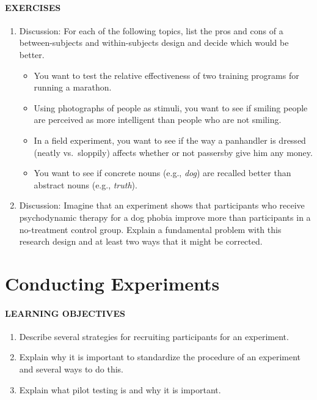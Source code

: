 \documentclass[
]{krantz}
\providecommand{\tightlist}{%
  \setlength{\itemsep}{0pt}\setlength{\parskip}{0pt}}
\begin{document}
\hypertarget{exercises-11}{%
\paragraph*{EXERCISES}\label{exercises-11}}

\begin{enumerate}
\def\labelenumi{\arabic{enumi}.}
\tightlist
\item
  Discussion: For each of the following topics, list the pros and cons of a between-subjects and within-subjects design and decide which would be better.

  \begin{itemize}
  \tightlist
  \item
    You want to test the relative effectiveness of two training programs for running a marathon.
  \item
    Using photographs of people as stimuli, you want to see if smiling people are perceived as more intelligent than people who are not smiling.
  \item
    In a field experiment, you want to see if the way a panhandler is dressed (neatly vs.~sloppily) affects whether or not passersby give him any money.
  \item
    You want to see if concrete nouns (e.g., \emph{dog}) are recalled better than abstract nouns (e.g., \emph{truth}).
  \end{itemize}
\item
  Discussion: Imagine that an experiment shows that participants who receive psychodynamic therapy for a dog phobia improve more than participants in a no-treatment control group. Explain a fundamental problem with this research design and at least two ways that it might be corrected.
\end{enumerate}

\hypertarget{conducting-experiments}{%
\section{Conducting Experiments}\label{conducting-experiments}}

\hypertarget{learning-objectives-14}{%
\paragraph*{LEARNING OBJECTIVES}\label{learning-objectives-14}}

\begin{enumerate}
\def\labelenumi{\arabic{enumi}.}
\tightlist
\item
  Describe several strategies for recruiting participants for an experiment.
\item
  Explain why it is important to standardize the procedure of an experiment and several ways to do this.
\item
  Explain what pilot testing is and why it is important.
\end{enumerate}
\end{document}
